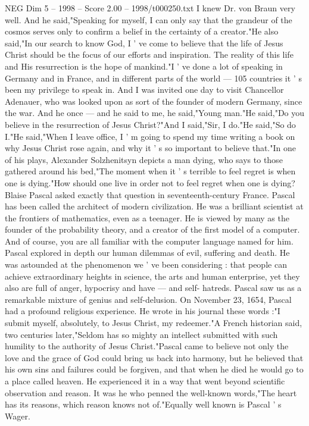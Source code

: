 \begin{textsample}{NEG Dim 5 – 1998 – Score 2.00 – 1998/t000250.txt}
I knew Dr. von Braun very well.
And he said,"Speaking for myself, I can only say that the grandeur of the cosmos serves only to confirm a belief in the certainty of a creator."He also said,"In our search to know God, I ' ve come to believe that the life of Jesus Christ should be the focus of our efforts and inspiration.
The reality of this life and His resurrection is the hope of mankind."I ' ve done a lot of speaking in Germany and in France, and in different parts of the world — 105 countries it ' s been my privilege to speak in.
And I was invited one day to visit Chancellor Adenauer, who was looked upon as sort of the founder of modern Germany, since the war.
And he once — and he said to me, he said,"Young man."He said,"Do you believe in the resurrection of Jesus Christ?"And I said,"Sir, I do."He said,"So do I."He said,"When I leave office, I ' m going to spend my time writing a book on why Jesus Christ rose again, and why it ' s so important to believe that."In one of his plays, Alexander Solzhenitsyn depicts a man dying, who says to those gathered around his bed,"The moment when it ' s terrible to feel regret is when one is dying."How should one live in order not to feel regret when one is dying?
Blaise Pascal asked exactly that question in seventeenth-century France.
Pascal has been called the architect of modern civilization.
He was a brilliant scientist at the frontiers of mathematics, even as a teenager.
He is viewed by many as the founder of the probability theory, and a creator of the first model of a computer.
And of course, you are all familiar with the computer language named for him.
Pascal explored in depth our human dilemmas of evil, suffering and death.
He was astounded at the phenomenon we ' ve been considering : that people can achieve extraordinary heights in science, the arts and human enterprise, yet they also are full of anger, hypocrisy and have — and self- hatreds.
Pascal saw us as a remarkable mixture of genius and self-delusion.
On November 23, 1654, Pascal had a profound religious experience.
He wrote in his journal these words :"I submit myself, absolutely, to Jesus Christ, my redeemer."A French historian said, two centuries later,"Seldom has so mighty an intellect submitted with such humility to the authority of Jesus Christ."Pascal came to believe not only the love and the grace of God could bring us back into harmony, but he believed that his own sins and failures could be forgiven, and that when he died he would go to a place called heaven.
He experienced it in a way that went beyond scientific observation and reason.
It was he who penned the well-known words,"The heart has its reasons, which reason knows not of."Equally well known is Pascal ' s Wager.

\end{textsample}
